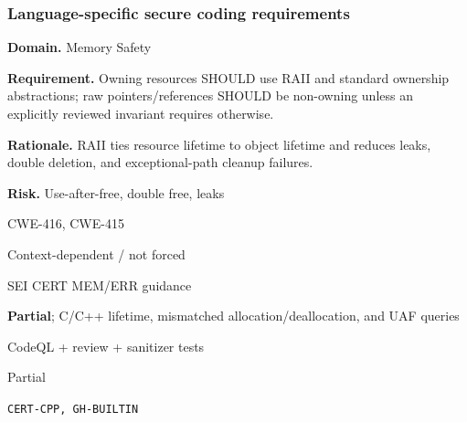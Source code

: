 \documentclass[10pt,letterpaper]{article}
\newcommand{\prioritybadge}[2]{\tcbox[on line,boxrule=0pt,arc=1.2mm,boxsep=0.7mm,left=1mm,right=1mm,top=0.4mm,bottom=0.4mm,colback=#2!12,coltext=#2]{\scriptsize\bfseries #1}}
\begin{document}
\subsubsection*{Language-specific secure coding requirements}

\begin{rulebox}[title={\texttt{SCS-CPP-MEM-001} \hfill \prioritybadge{Critical Control}{Critical}}]
\textbf{Domain.} Memory Safety

\textbf{Requirement.} Owning resources SHOULD use RAII and standard ownership abstractions; raw pointers/references SHOULD be non-owning unless an explicitly reviewed invariant requires otherwise.

\textbf{Rationale.} RAII ties resource lifetime to object lifetime and reduces leaks, double deletion, and exceptional-path cleanup failures.

\textbf{Risk.} Use-after-free, double free, leaks

\begin{description}[leftmargin=2.65cm,labelwidth=2.3cm,style=nextline,itemsep=1pt,topsep=3pt]
  \item[CWE] CWE-416, CWE-415
  \item[OWASP] Context-dependent / not forced
  \item[CERT] SEI CERT MEM/ERR guidance
  \item[CodeQL] \textbf{Partial}; C/C++ lifetime, mismatched allocation/deallocation, and UAF queries
  \item[Enforcement] CodeQL + review + sanitizer tests
  \item[Automation] Partial
  \item[Sources] \texttt{CERT-CPP, GH-BUILTIN}
\end{description}
\end{rulebox}
\end{document}
